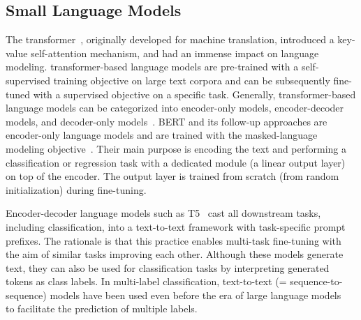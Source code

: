 \subsection{Small Language Models}
The transformer~\cite{DBLP:conf/nips/VaswaniSPUJGKP17}, originally developed for machine translation, introduced a key-value self-attention mechanism, and had an immense impact on language modeling.
transformer-based language models are pre-trained with a self-supervised training objective on large text corpora and can be subsequently fine-tuned with a supervised objective on a specific task.
Generally, transformer-based language models can be categorized into encoder-only models, encoder-decoder models, and decoder-only models~\cite{yang2023harnessing}.
BERT and its follow-up approaches are encoder-only language models and are trained with the masked-language modeling objective~\cite{DBLP:conf/naacl/DevlinCLT19}.
Their main purpose is encoding the text and performing a classification or regression task with a dedicated module (\eg a linear output layer) on top of the encoder.
The output layer is trained from scratch (\ie from random initialization) during fine-tuning.

Encoder-decoder language models such as T5~\cite{T5} cast all downstream tasks, including classification, into a text-to-text framework with task-specific prompt prefixes. The rationale is that this practice enables multi-task fine-tuning with the aim of similar tasks improving each other.
Although these models generate text, they can also be used for classification tasks by interpreting generated tokens as class labels. 
In multi-label classification, text-to-text (= sequence-to-sequence) models have been used even before the era of large language models~\cite{namMaximizingSubsetAccuracy2017} to facilitate the prediction of multiple labels.

